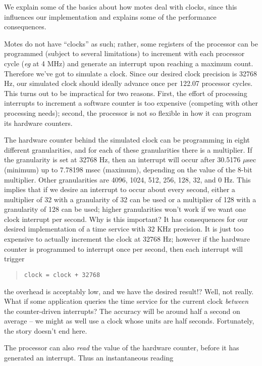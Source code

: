 \documentclass[11pt]{article}
\begin{document}
We explain some of the basics about how motes deal with clocks,
since this influences our implementation and explains some of the
performance consequences.  
\par
Motes do not have ``clocks'' as such;  rather, some registers 
of the processor can be programmed (subject to several limitations)
to increment with each processor cycle (\emph{eg} at 4 MHz) and 
generate an interrupt upon reaching a maximum count.  Therefore we've
got to simulate a clock.  Since our desired clock precision 
is 32768 Hz, our simulated clock should ideally advance once 
per 122.07 processor cycles.  This turns out to be impractical
for two reasons.  First, the effort of processing interrupts to
increment a software counter is too expensive (competing with 
other processing needs);  second, the processor is not so flexible
in how it can program its hardware counters.  
\par
The hardware counter behind the simulated clock can be programming
in eight different granularities, and for each of these granularities
there is a multiplier.  If the granularity is set at 32768 Hz,
then an interrupt will occur after 30.5176 $\mu$sec (minimum) up to
7.78198 msec (maximum), depending on the value of the 8-bit multiplier.
Other granularities are 4096, 1024, 512, 256, 128, 32, and 0 Hz.
This implies that if we desire an interrupt to occur about every
second, either a multiplier of 32 with a granularity of 32 can be 
used or a multiplier of 128 with a granularity of 128 can be used;
higher granularities won't work if we want one clock interrupt per
second.  Why is this important?  It has consequences for our 
desired implementation of a time service with 32 KHz precision. 
It is just too expensive to actually increment the clock at 32768 Hz;
however if the hardware counter is programmed to interrupt once per
second, then each interrupt will trigger 
\begin{quote}
\verb'clock = clock + 32768'
\end{quote}
the overhead is acceptably low, and we have the desired result!?  
Well, not really.  What if some application queries the time service
for the current clock \emph{between} the counter-driven interrupts?
The accuracy will be around half a second on average -- we might as
well use a clock whose units are half seconds.  Fortunately, the 
story doesn't end here.
\par
The processor can also \emph{read} the value of the hardware counter,
before it has generated an interrupt.  Thus an instantaneous reading
\end{document}
